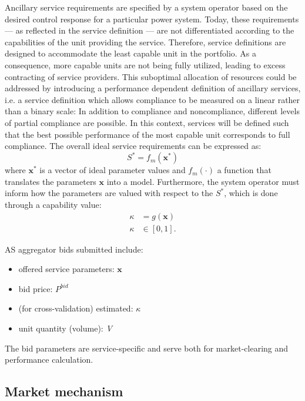 Ancillary service requirements are specified by a system operator based on the desired control response for a particular power system. Today, these requirements --- as reflected in the service definition --- are not differentiated according to the capabilities of the unit providing the service. Therefore, service definitions are designed to accommodate the least capable unit in the portfolio. As a consequence, more capable units are not being fully utilized, leading to excess contracting of service providers.
This suboptimal allocation of resources could be addressed by introducing a performance dependent definition of ancillary services, i.e. a service definition which allows compliance to be measured on a linear rather than a binary scale: In addition to compliance and noncompliance, different levels of partial compliance are possible.
In this context, services will be defined such that the best possible performance of the most capable unit corresponds to full compliance. The overall ideal service requirements can be expressed as:
\begin{equation}
	S^* = f_m(\textbf{x}^*) \label{eq:ddrasoptimaltender}
\end{equation}
where $\textbf{x}^*$ is a vector of ideal parameter values and $f_m(\cdot)$ a function that translates the parameters $\textbf{x}$ into a model. Furthermore, the system operator must inform how the parameters are valued with respect to the $S^*$, which is done through a capability value:
\begin{align}
    \kappa &= g(\mathbf{x}) \\
    \kappa &\in [0,1].
\end{align}

AS aggregator bids submitted include: 
\begin{itemize}
\item offered service parameters: $\mathbf{x}$
\item bid price: $P^{bid}$
\item (for cross-validation) estimated: $\kappa$
\item unit quantity (volume): \emph{V}
\end{itemize}

The bid parameters are service-specific and serve both for market-clearing and performance calculation. 

\subsection{Market mechanism}\label{subsec:marketmechanism}

